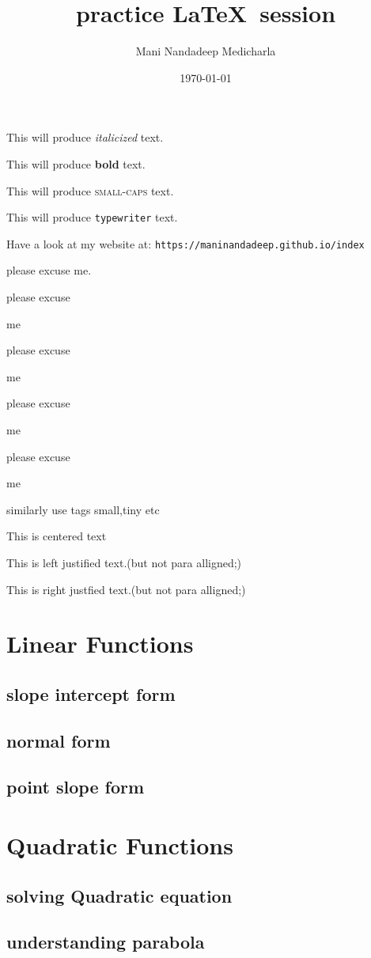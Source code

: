\documentclass[11pt]{article}
\begin{document}
\tableofcontents

\title{practice \LaTeX \ session}
\author{Mani Nandadeep Medicharla}
\date{\today}
\maketitle

This will produce \textit{italicized} text.

This will produce \textbf{bold} text.

This will produce \textsc{small-caps} text.

This will produce \texttt{typewriter} text.

Have a look at my website at: \texttt{https://maninandadeep.github.io/index}

please excuse me.

please excuse \begin{large}
me
\end{large}

please excuse \begin{Large}
me
\end{Large}

please excuse \begin{huge}
me
\end{huge}

please excuse \begin{Huge}
me
\end{Huge}

similarly use tags small,tiny etc

\begin{center}
This is centered text
\end{center}

\begin{flushleft}
This is left justified text.(but not para alligned;)
\end{flushleft}

\begin{flushright}
This  is right justfied text.(but not para alligned;)
\end{flushright}

\section{Linear Functions}
	\subsection{slope intercept form}
	\subsection{normal form}
	\subsection{point slope form}
	
\section{Quadratic Functions}
	\subsection{solving Quadratic equation}
	\subsection{understanding parabola}
\end{document}

